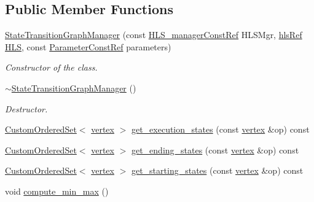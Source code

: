 \subsection*{Public Member Functions}
\begin{DoxyCompactItemize}
\item 
\hyperlink{classStateTransitionGraphManager_a138e3a539f39750d6715514a28644970}{State\+Transition\+Graph\+Manager} (const \hyperlink{hls__manager_8hpp_a1b481383e3beabc89bd7562ae672dd8c}{H\+L\+S\+\_\+manager\+Const\+Ref} H\+L\+S\+Mgr, \hyperlink{hls_8hpp_a75d0c73923d0ddfa28c4843a802c73a7}{hls\+Ref} \hyperlink{classStateTransitionGraphManager_a53c457064906c1b6c3c0a8e8a05664a6}{H\+LS}, const \hyperlink{Parameter_8hpp_a37841774a6fcb479b597fdf8955eb4ea}{Parameter\+Const\+Ref} parameters)
\begin{DoxyCompactList}\small\item\em Constructor of the class. \end{DoxyCompactList}\item 
\hyperlink{classStateTransitionGraphManager_a8892ac361d932cbf473d214800e4b067}{$\sim$\+State\+Transition\+Graph\+Manager} ()
\begin{DoxyCompactList}\small\item\em Destructor. \end{DoxyCompactList}\item 
\hyperlink{classCustomOrderedSet}{Custom\+Ordered\+Set}$<$ \hyperlink{graph_8hpp_abefdcf0544e601805af44eca032cca14}{vertex} $>$ \hyperlink{classStateTransitionGraphManager_afdd93a2fc9f27b2c795bef76f62a07f8}{get\+\_\+execution\+\_\+states} (const \hyperlink{graph_8hpp_abefdcf0544e601805af44eca032cca14}{vertex} \&op) const
\item 
\hyperlink{classCustomOrderedSet}{Custom\+Ordered\+Set}$<$ \hyperlink{graph_8hpp_abefdcf0544e601805af44eca032cca14}{vertex} $>$ \hyperlink{classStateTransitionGraphManager_a37495566ff3376074fbc09598e669ac3}{get\+\_\+ending\+\_\+states} (const \hyperlink{graph_8hpp_abefdcf0544e601805af44eca032cca14}{vertex} \&op) const
\item 
\hyperlink{classCustomOrderedSet}{Custom\+Ordered\+Set}$<$ \hyperlink{graph_8hpp_abefdcf0544e601805af44eca032cca14}{vertex} $>$ \hyperlink{classStateTransitionGraphManager_adf4d0d8cffd1c2055876aea1f74c45b8}{get\+\_\+starting\+\_\+states} (const \hyperlink{graph_8hpp_abefdcf0544e601805af44eca032cca14}{vertex} \&op) const
\item 
void \hyperlink{classStateTransitionGraphManager_ac686261b6a110f27d563e3dbdd1cde57}{compute\+\_\+min\+\_\+max} ()

\end{DoxyCompactItemize}
